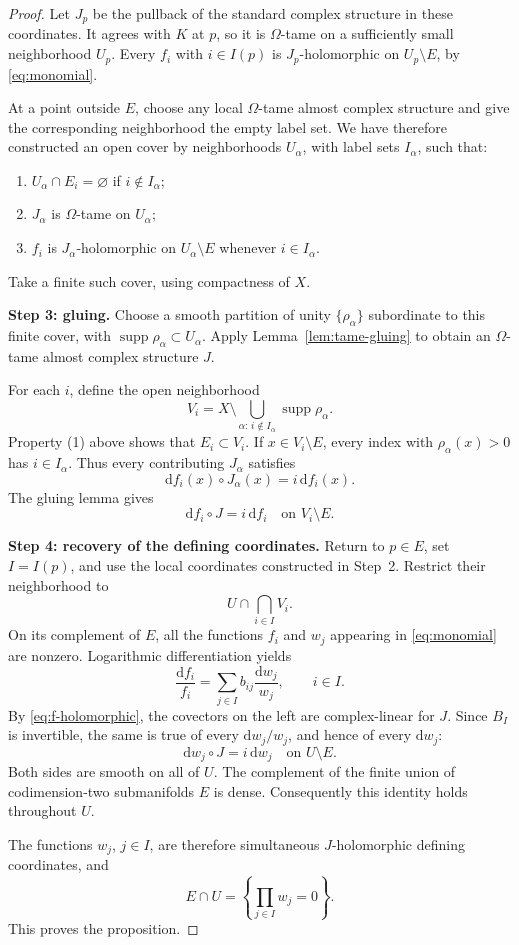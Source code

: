 \documentclass[11pt]{amsart}
\theoremstyle{definition}
\theoremstyle{remark}
\newcommand{\dd}{\mathrm d}
\newcommand{\supp}{\operatorname{supp}}
\begin{document}
\begin{proof}
Let $J_p$ be the pullback of the standard complex structure
in these coordinates.  It agrees with $K$ at $p$, so it is
$\Omega$-tame on a sufficiently small neighborhood $U_p$.
Every $f_i$ with $i\in I(p)$ is $J_p$-holomorphic on
$U_p\setminus E$, by \eqref{eq:monomial}.

At a point outside $E$, choose any local $\Omega$-tame almost
complex structure and give the corresponding neighborhood the
empty label set.  We have therefore constructed an open cover
by neighborhoods $U_\alpha$, with label sets $I_\alpha$, such
that:
\begin{enumerate}[label=\textup{(\arabic*)}]
\item $U_\alpha\cap E_i=\varnothing$ if $i\notin I_\alpha$;
\item $J_\alpha$ is $\Omega$-tame on $U_\alpha$;
\item $f_i$ is $J_\alpha$-holomorphic on $U_\alpha\setminus E$
      whenever $i\in I_\alpha$.
\end{enumerate}
Take a finite such cover, using compactness of $X$.

\medskip
\noindent\textbf{Step 3: gluing.}
Choose a smooth partition of unity $\{\rho_\alpha\}$
subordinate to this finite cover, with
$\supp\rho_\alpha\subset U_\alpha$.  Apply
Lemma~\ref{lem:tame-gluing} to obtain an $\Omega$-tame almost
complex structure $J$.

For each $i$, define the open neighborhood
\[
V_i
=
X\setminus
\bigcup_{\alpha:\,i\notin I_\alpha}\supp\rho_\alpha.
\]
Property (1) above shows that $E_i\subset V_i$.
If $x\in V_i\setminus E$, every index with
$\rho_\alpha(x)>0$ has $i\in I_\alpha$.  Thus every contributing
$J_\alpha$ satisfies
\[
\dd f_i(x)\circ J_\alpha(x)=i\,\dd f_i(x).
\]
The gluing lemma gives
\begin{equation}\label{eq:f-holomorphic}
\dd f_i\circ J=i\,\dd f_i
\quad\text{on }V_i\setminus E.
\end{equation}

\medskip
\noindent\textbf{Step 4: recovery of the defining coordinates.}
Return to $p\in E$, set $I=I(p)$, and use the local coordinates
constructed in Step~2.  Restrict their neighborhood to
\[
U\cap\bigcap_{i\in I}V_i.
\]
On its complement of $E$, all the functions $f_i$ and $w_j$
appearing in \eqref{eq:monomial} are nonzero.  Logarithmic
differentiation yields
\[
\frac{\dd f_i}{f_i}
=
\sum_{j\in I}b_{ij}\frac{\dd w_j}{w_j},
\qquad i\in I.
\]
By \eqref{eq:f-holomorphic}, the covectors on the left are
complex-linear for $J$.  Since $B_I$ is invertible, the same
is true of every $\dd w_j/w_j$, and hence of every $\dd w_j$:
\[
\dd w_j\circ J=i\,\dd w_j
\quad\text{on }U\setminus E.
\]
Both sides are smooth on all of $U$.  The complement of the
finite union of codimension-two submanifolds $E$ is dense.
Consequently this identity holds throughout $U$.

The functions $w_j$, $j\in I$, are therefore simultaneous
$J$-holomorphic defining coordinates, and
\[
E\cap U=\left\{\prod_{j\in I}w_j=0\right\}.
\]
This proves the proposition.
\end{proof}
\end{document}
